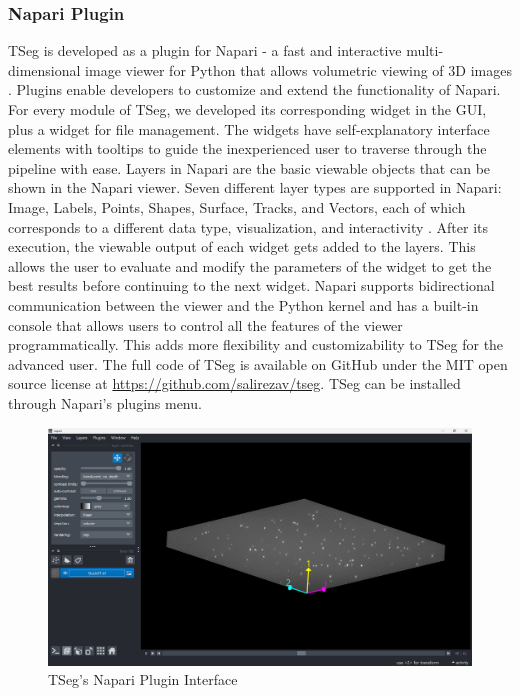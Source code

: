 \documentclass[./dissertation.tex]{subfiles}
\begin{document}
\subsubsection{Napari Plugin}
TSeg is developed as a plugin for Napari - a fast and interactive multi-dimensional image viewer for Python that allows volumetric viewing of 3D images \cite{sofroniew_nicholas_2022_6598542}. Plugins enable developers to customize and extend the functionality of Napari. For every module of TSeg, we developed its corresponding widget in the GUI, plus a widget for file management. The widgets have self-explanatory interface elements with tooltips to guide the inexperienced user to traverse through the pipeline with ease. Layers in Napari are the basic viewable objects that can be shown in the Napari viewer. Seven different layer types are supported in Napari: Image, Labels, Points, Shapes, Surface, Tracks, and Vectors, each of which corresponds to a different data type, visualization, and interactivity \cite{sofroniew_nicholas_2022_6598542}. After its execution, the viewable output of each widget gets added to the layers. This allows the user to evaluate and modify the parameters of the widget to get the best results before continuing to the next widget. Napari supports bidirectional communication between the viewer and the Python kernel and has a built-in console that allows users to control all the features of the viewer programmatically. This adds more flexibility and customizability to TSeg for the advanced user. The full code of TSeg is available on GitHub under the MIT open source license at \url{https://github.com/salirezav/tseg}. TSeg can be installed through Napari's plugins menu.

\begin{figure}[h]
    \centering\includegraphics[width=.8\textwidth]{figures/tseg/3d viewer.png}
    \caption{TSeg's Napari Plugin Interface}
    \label{fig:viewer}
\end{figure}
\end{document}
